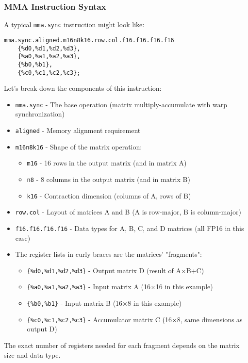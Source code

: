 \subsubsection{MMA Instruction Syntax}

A typical \texttt{mma.sync} instruction might look like:

\begin{lstlisting}[style=ptx]
mma.sync.aligned.m16n8k16.row.col.f16.f16.f16.f16 
    {%d0,%d1,%d2,%d3}, 
    {%a0,%a1,%a2,%a3}, 
    {%b0,%b1}, 
    {%c0,%c1,%c2,%c3};
\end{lstlisting}

Let's break down the components of this instruction:

\begin{itemize}
    \item \texttt{mma.sync} - The base operation (matrix multiply-accumulate with warp synchronization)
    
    \item \texttt{aligned} - Memory alignment requirement
    
    \item \texttt{m16n8k16} - Shape of the matrix operation:
    \begin{itemize}
        \item \texttt{m16} - 16 rows in the output matrix (and in matrix A)
        \item \texttt{n8} - 8 columns in the output matrix (and in matrix B)
        \item \texttt{k16} - Contraction dimension (columns of A, rows of B)
    \end{itemize}
    
    \item \texttt{row.col} - Layout of matrices A and B (A is row-major, B is column-major)
    
    \item \texttt{f16.f16.f16.f16} - Data types for A, B, C, and D matrices (all FP16 in this case)
    
    \item The register lists in curly braces are the matrices' "fragments":

    \begin{itemize}
        \item \texttt{\{\%d0,\%d1,\%d2,\%d3\}} - Output matrix D (result of A×B+C)
        \item \texttt{\{\%a0,\%a1,\%a2,\%a3\}} - Input matrix A (16×16 in this example)
        \item \texttt{\{\%b0,\%b1\}} - Input matrix B (16×8 in this example)
        \item \texttt{\{\%c0,\%c1,\%c2,\%c3\}} - Accumulator matrix C (16×8, same dimensions as output D)
    \end{itemize}
\end{itemize}

The exact number of registers needed for each fragment depends on the matrix size and data type.

